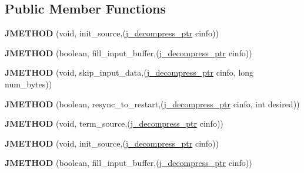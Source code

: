 \subsection*{Public Member Functions}
\begin{DoxyCompactItemize}
\item 
\mbox{\label{structjpeg__source__mgr_af8fda02c19c9dc4e505daabb77c3ad81}} 
{\bfseries J\+M\+E\+T\+H\+OD} (void, init\+\_\+source,(\hyperlink{structjpeg__decompress__struct}{j\+\_\+decompress\+\_\+ptr} cinfo))
\item 
\mbox{\label{structjpeg__source__mgr_ab4a579b1f50108e2de73c7c0c1bbb9fd}} 
{\bfseries J\+M\+E\+T\+H\+OD} (boolean, fill\+\_\+input\+\_\+buffer,(\hyperlink{structjpeg__decompress__struct}{j\+\_\+decompress\+\_\+ptr} cinfo))
\item 
\mbox{\label{structjpeg__source__mgr_a3e29df8ddadb0c15e54b69b5a7a10305}} 
{\bfseries J\+M\+E\+T\+H\+OD} (void, skip\+\_\+input\+\_\+data,(\hyperlink{structjpeg__decompress__struct}{j\+\_\+decompress\+\_\+ptr} cinfo, long num\+\_\+bytes))
\item 
\mbox{\label{structjpeg__source__mgr_a60a35ccd1fb8d954f34c0cdbf29ac010}} 
{\bfseries J\+M\+E\+T\+H\+OD} (boolean, resync\+\_\+to\+\_\+restart,(\hyperlink{structjpeg__decompress__struct}{j\+\_\+decompress\+\_\+ptr} cinfo, int desired))
\item 
\mbox{\label{structjpeg__source__mgr_a6c0683ce1166b9ee659b2d3aa1efb1c2}} 
{\bfseries J\+M\+E\+T\+H\+OD} (void, term\+\_\+source,(\hyperlink{structjpeg__decompress__struct}{j\+\_\+decompress\+\_\+ptr} cinfo))
\item 
\mbox{\label{structjpeg__source__mgr_af8fda02c19c9dc4e505daabb77c3ad81}} 
{\bfseries J\+M\+E\+T\+H\+OD} (void, init\+\_\+source,(\hyperlink{structjpeg__decompress__struct}{j\+\_\+decompress\+\_\+ptr} cinfo))
\item 
\mbox{\label{structjpeg__source__mgr_ab4a579b1f50108e2de73c7c0c1bbb9fd}} 
{\bfseries J\+M\+E\+T\+H\+OD} (boolean, fill\+\_\+input\+\_\+buffer,(\hyperlink{structjpeg__decompress__struct}{j\+\_\+decompress\+\_\+ptr} cinfo))

\end{DoxyCompactItemize}
